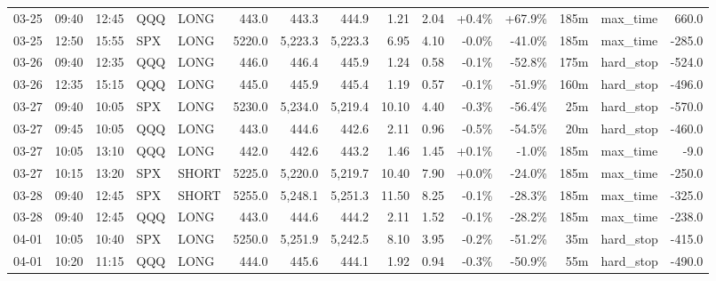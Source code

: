 \documentclass[11pt,a4paper,twoside]{article}
\begin{document}
\begin{landscape}
\begin{center}
\begin{longtable}{>{\color{txtmain}}l l l l l r r r r r r r r >{\color{txtmain}}l r}
03-25 & 09:40 & 12:45 & QQQ & LONG & 443.0 & 443.3 & 444.9 & 1.21 & 2.04 & \textcolor{wingreen}{+0.4\%} & \textcolor{wingreen}{+67.9\%} & 185m & max\_time & \textcolor{wingreen}{660.0} \\
03-25 & 12:50 & 15:55 & SPX & LONG & 5220.0 & 5,223.3 & 5,223.3 & 6.95 & 4.10 & \textcolor{lossred}{-0.0\%} & \textcolor{lossred}{-41.0\%} & 185m & max\_time & \textcolor{lossred}{-285.0} \\
03-26 & 09:40 & 12:35 & QQQ & LONG & 446.0 & 446.4 & 445.9 & 1.24 & 0.58 & \textcolor{lossred}{-0.1\%} & \textcolor{lossred}{-52.8\%} & 175m & hard\_stop & \textcolor{lossred}{-524.0} \\
03-26 & 12:35 & 15:15 & QQQ & LONG & 445.0 & 445.9 & 445.4 & 1.19 & 0.57 & \textcolor{lossred}{-0.1\%} & \textcolor{lossred}{-51.9\%} & 160m & hard\_stop & \textcolor{lossred}{-496.0} \\
03-27 & 09:40 & 10:05 & SPX & LONG & 5230.0 & 5,234.0 & 5,219.4 & 10.10 & 4.40 & \textcolor{lossred}{-0.3\%} & \textcolor{lossred}{-56.4\%} & 25m & hard\_stop & \textcolor{lossred}{-570.0} \\
03-27 & 09:45 & 10:05 & QQQ & LONG & 443.0 & 444.6 & 442.6 & 2.11 & 0.96 & \textcolor{lossred}{-0.5\%} & \textcolor{lossred}{-54.5\%} & 20m & hard\_stop & \textcolor{lossred}{-460.0} \\
03-27 & 10:05 & 13:10 & QQQ & LONG & 442.0 & 442.6 & 443.2 & 1.46 & 1.45 & \textcolor{wingreen}{+0.1\%} & \textcolor{lossred}{-1.0\%} & 185m & max\_time & \textcolor{lossred}{-9.0} \\
03-27 & 10:15 & 13:20 & SPX & SHORT & 5225.0 & 5,220.0 & 5,219.7 & 10.40 & 7.90 & \textcolor{wingreen}{+0.0\%} & \textcolor{lossred}{-24.0\%} & 185m & max\_time & \textcolor{lossred}{-250.0} \\
03-28 & 09:40 & 12:45 & SPX & SHORT & 5255.0 & 5,248.1 & 5,251.3 & 11.50 & 8.25 & \textcolor{lossred}{-0.1\%} & \textcolor{lossred}{-28.3\%} & 185m & max\_time & \textcolor{lossred}{-325.0} \\
03-28 & 09:40 & 12:45 & QQQ & LONG & 443.0 & 444.6 & 444.2 & 2.11 & 1.52 & \textcolor{lossred}{-0.1\%} & \textcolor{lossred}{-28.2\%} & 185m & max\_time & \textcolor{lossred}{-238.0} \\
04-01 & 10:05 & 10:40 & SPX & LONG & 5250.0 & 5,251.9 & 5,242.5 & 8.10 & 3.95 & \textcolor{lossred}{-0.2\%} & \textcolor{lossred}{-51.2\%} & 35m & hard\_stop & \textcolor{lossred}{-415.0} \\
04-01 & 10:20 & 11:15 & QQQ & LONG & 444.0 & 445.6 & 444.1 & 1.92 & 0.94 & \textcolor{lossred}{-0.3\%} & \textcolor{lossred}{-50.9\%} & 55m & hard\_stop & \textcolor{lossred}{-490.0} \\

\end{longtable}
\end{center}
\end{landscape}
\end{document}
